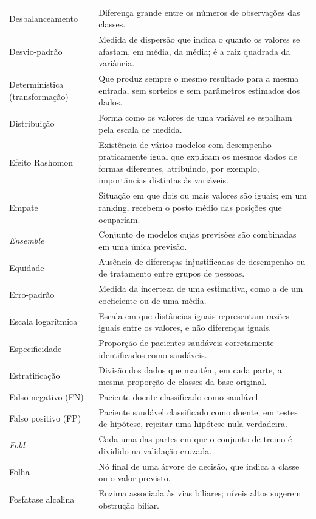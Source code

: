 \begin{longtable}{@{}p{3.8cm}p{10.7cm}@{}}
Desbalanceamento & Diferença grande entre os números de observações das classes. \\[0.15cm]
Desvio-padrão & Medida de dispersão que indica o quanto os valores se afastam, em média, da média; é a raiz quadrada da variância. \\[0.15cm]
Determinística (transformação) & Que produz sempre o mesmo resultado para a mesma entrada, sem sorteios e sem parâmetros estimados dos dados. \\[0.15cm]
Distribuição & Forma como os valores de uma variável se espalham pela escala de medida. \\[0.15cm]
Efeito Rashomon & Existência de vários modelos com desempenho praticamente igual que explicam os mesmos dados de formas diferentes, atribuindo, por exemplo, importâncias distintas às variáveis. \\[0.15cm]
Empate & Situação em que dois ou mais valores são iguais; em um ranking, recebem o posto médio das posições que ocupariam. \\[0.15cm]
\textit{Ensemble} & Conjunto de modelos cujas previsões são combinadas em uma única previsão. \\[0.15cm]
Equidade & Ausência de diferenças injustificadas de desempenho ou de tratamento entre grupos de pessoas. \\[0.15cm]
Erro-padrão & Medida da incerteza de uma estimativa, como a de um coeficiente ou de uma média. \\[0.15cm]
Escala logarítmica & Escala em que distâncias iguais representam razões iguais entre os valores, e não diferenças iguais. \\[0.15cm]
Especificidade & Proporção de pacientes saudáveis corretamente identificados como saudáveis. \\[0.15cm]
Estratificação & Divisão dos dados que mantém, em cada parte, a mesma proporção de classes da base original. \\[0.15cm]
Falso negativo (FN) & Paciente doente classificado como saudável. \\[0.15cm]
Falso positivo (FP) & Paciente saudável classificado como doente; em testes de hipótese, rejeitar uma hipótese nula verdadeira. \\[0.15cm]
\textit{Fold} & Cada uma das partes em que o conjunto de treino é dividido na validação cruzada. \\[0.15cm]
Folha & Nó final de uma árvore de decisão, que indica a classe ou o valor previsto. \\[0.15cm]
Fosfatase alcalina & Enzima associada às vias biliares; níveis altos sugerem obstrução biliar. \\[0.15cm]

\end{longtable}
